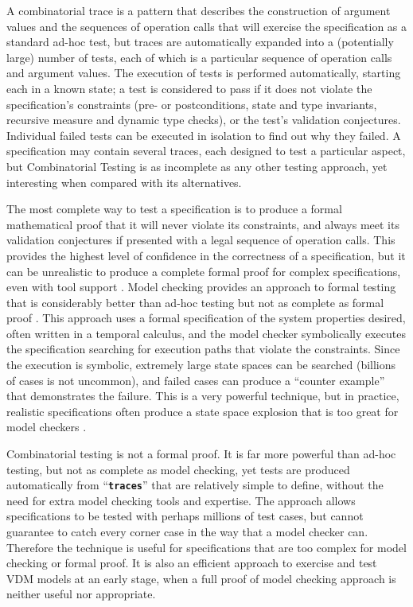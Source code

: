 \documentclass{overturerepchap}
\begin{document}
A combinatorial trace is a pattern that describes the construction of argument
values and the sequences of operation calls that will exercise the
specification as a standard ad-hoc test, but traces are automatically expanded
into a (potentially large) number of tests, each of which is a particular
sequence of operation calls and argument values. The execution of tests is
performed automatically, starting each in a known state; a test is considered
to pass if it does not violate the specification's constraints (pre- or
postconditions, state and type invariants, recursive measure and dynamic type
checks), or the test's validation conjectures. Individual failed tests can be
executed in isolation to find out why they failed.  A specification may contain
several traces, each designed to test a particular aspect, but Combinatorial
Testing is as incomplete as any other testing approach, yet interesting when
compared with its alternatives. 


The most complete way to test a specification is to produce a formal
mathematical proof that it will never violate its constraints, and always meet
its validation conjectures if presented with a legal sequence of operation
calls. This provides the highest level of confidence in the correctness of a
specification, but it can be unrealistic to produce a complete formal proof for
complex specifications, even with tool support \cite{Paulson97,Bicarregui&94}.
Model checking provides an approach to formal testing that is considerably
better than ad-hoc testing but not as complete as formal proof \cite{Clarke&99}.
This approach uses a formal specification of the system properties desired,
often written in a temporal calculus, and the model checker symbolically
executes the specification searching for execution paths that violate the
constraints. Since the execution is symbolic, extremely large state spaces can
be searched (billions of cases is not uncommon), and failed cases can produce a
``counter example'' that demonstrates the failure. This is a very powerful
technique, but in practice, realistic specifications often produce a state
space explosion that is too great for model checkers \cite{Clarke2012}.

Combinatorial testing is not a formal proof. It is far more powerful than
ad-hoc testing, but not as complete as model checking, yet tests are produced
automatically from ``\texttt{\textbf{traces}}'' that are relatively simple to
define, without the need for extra model checking tools and expertise. The
approach allows specifications to be tested with perhaps millions of test
cases, but cannot guarantee to catch every corner case in the way that a model
checker can. Therefore the technique is useful for specifications that are too
complex for model checking or formal proof. It is also an efficient approach to
exercise and test VDM models at an early stage, when a full proof of model
checking approach is neither useful nor appropriate.
\end{document}
